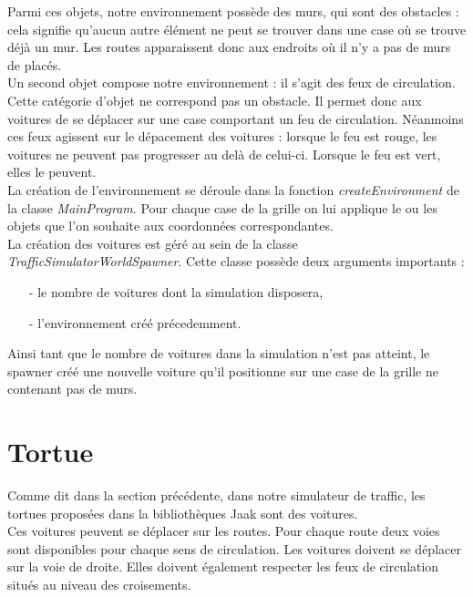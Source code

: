 \documentclass[a4paper,12pt]{report}
\begin{document}
Parmi ces objets, notre environnement possède des murs, qui sont des obstacles : cela signifie qu'aucun autre élément ne peut se trouver dans une case où se trouve déjà un mur. Les routes apparaissent donc aux endroits où il n'y a pas de murs de placés. \\

Un second objet compose notre environnement : il s'agit des feux de circulation. Cette catégorie d'objet ne correspond pas un obstacle. Il permet donc aux voitures de se déplacer sur une case comportant un feu de circulation. Néanmoins ces feux agissent sur le dépacement des voitures : lorsque le feu est rouge, les voitures ne peuvent pas progresser au delà de celui-ci. Lorsque le feu est vert, elles le peuvent. \\

La création de l'environnement se déroule dans la fonction \emph{createEnvironment} de la classe \emph{MainProgram}. Pour chaque case de la grille on lui applique le ou les objets que l'on souhaite aux coordonnées correspondantes. \\

La création des voitures est géré au sein de la classe \emph{TrafficSimulatorWorldSpawner}. Cette classe possède deux arguments importants : 
\begin{itemize}
\item[-] le nombre de voitures dont la simulation disposera,
\item[-] l'environnement créé précedemment.
\end{itemize}

Ainsi tant que le nombre de voitures dans la simulation n'est pas atteint, le spawner créé une nouvelle voiture qu'il positionne sur une case de la grille ne contenant pas de murs.

\section{Tortue}

Comme dit dans la section précédente, dans notre simulateur de traffic, les tortues proposées dans la bibliothèques Jaak sont des voitures. \\

Ces voitures peuvent se déplacer sur les routes. Pour chaque route deux voies sont disponibles pour chaque sens de circulation. Les voitures doivent se déplacer sur la voie de droite. Elles doivent également respecter les feux de circulation situés au niveau des croisements. \\
\end{document}
